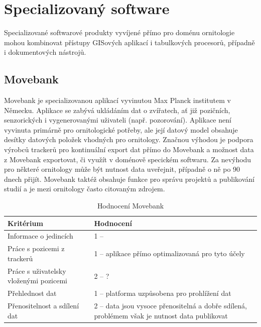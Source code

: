 \section{Specializovaný software}

Specializované softwarové produkty vyvíjené přímo pro doménu ornitologie mohou kombinovat přístupy GISových aplikací i tabulkových procesorů, případně i dokumentových nástrojů. %

\subsection{Movebank}

Movebank je specializovanou aplikací vyvinutou Max Planck institutem v Německu. Aplikace se zabývá ukládáním dat o zvířatech, ať již pozičních, senzorických i vygenerovanými uživateli (např. pozorování). Aplikace není vyvinuta primárně pro ornitologické potřeby, ale její datový model obsahuje desítky datových položek vhodných pro ornitology. Značnou výhodou je podpora výrobců trackerů pro kontinuální export dat přímo do Movebank a možnost data z Movebank exportovat, či využít v doménově specickém softwaru. Za nevýhodu pro některé ornitology může být nutnost data uveřejnit, případně o ně po 90 dnech přijít. Movebank taktéž obsahuje funkce pro správu projektů a publikování studií a je mezi ornitology často citovaným zdrojem.



\begin{table}[h]
	\begin{tabular}{ | l | l | }
		\hline
		Kritérium                              & Hodnocení \\
		\hline			
		Informace o jedincích                  & 1 --           \\
		Práce s pozicemi z trackerů            & 1 -- aplikace přímo optimalizovaná pro tyto účely          \\
		Práce s uživatelsky vloženými pozicemi & 2 -- ?          \\
		Přehlednost dat                        & 1 -- platforma uzpůsobena pro prohlížení dat          \\
		Přenositelnost a sdílení dat           & 2 -- data jsou vysoce přenositelná a dobře sdílená, problémem však je nutnost data publikovat          \\
		\hline	
	\end{tabular}
	\caption{Hodnocení Movebank}
\end{table}

